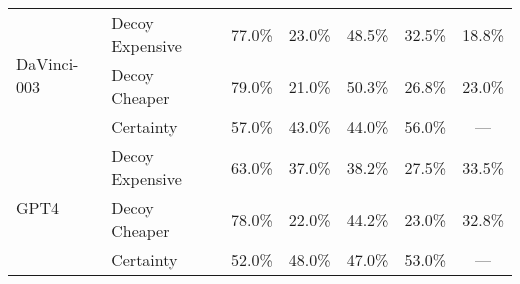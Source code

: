 \begin{table*}[th!]
\begin{tabular}{@{}llcc|c  cc@{}}
\multirow{3}{*}{ \hspace{0.1cm} DaVinci-003} 
 & Decoy Expensive &                            77.0\% &                            23.0\% &      48.5\% &                       32.5\% &                       18.8\% \\
 &   Decoy Cheaper &                            79.0\% &                            21.0\% &      50.3\% &                       26.8\% &                       23.0\% \\
 &       Certainty &          57.0\% &                        43.0\% &                       44.0\% &                       56.0\% &                       --- \\

\midrule

\multirow{3}{*}{ \hspace{0.7cm} GPT4} 
 & Decoy Expensive &                            63.0\% &                            37.0\% &           38.2\% &                       27.5\% &                       33.5\% \\
  &   Decoy Cheaper &                            78.0\% &                            22.0\% &          44.2\% &                       23.0\% &                       32.8\% \\
  &       Certainty &                    52.0\% &                        48.0\% &                       47.0\% &                       53.0\% &                        --- \\
\midrule


\end{tabular}
\end{table*}
